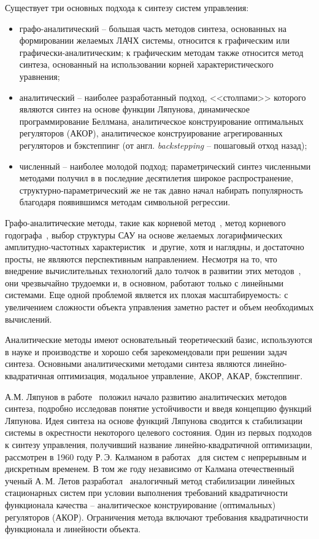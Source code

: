 Существует три основных подхода к синтезу систем управления:
\begin{itemize}
    \item графо-аналитический -- большая часть методов синтеза, основанных на формировании желаемых ЛАЧХ системы, относится к графическим или графически-аналитическим; к графическим методам также относится метод синтеза, основанный на использовании корней характеристического уравнения;
    \item аналитический -- наиболее разработанный подход, <<столпами>> которого являются синтез на основе функции Ляпунова, динамическое программирование Беллмана, аналитическое конструирование оптимальных регуляторов (АКОР), аналитическое конструирование агрегированных регуляторов и бэкстеппинг (от англ. \textit{backstepping} -- пошаговый отход назад);
    \item численный -- наиболее молодой подход; параметрический синтез численными методами получил в в последние десятилетия широкое распространение, структурно-параметрический же не так давно начал набирать популярность благодаря появившимся методам символьной регрессии.
\end{itemize}

Графо-аналитические методы, такие как корневой метод~\cite{Соколов1952}, метод корневого годографа~\cite{Kuo1967}, выбор структуры САУ на основе желаемых логарифмических амплитудно-частотных характеристик~\cite{Солодовников1953} и другие, хотя и наглядны, и достаточно просты, не являются перспективным направлением. 
Несмотря на то, что внедрение вычислительных технологий дало толчок в развитии этих методов~\cite{Барковский1981, Имаев1998}, они чрезвычайно трудоемки и, в основном, работают только с линейными системами. Еще одной проблемой является их плохая масштабируемость: с увеличением сложности объекта управления заметно растет и объем необходимых вычислений.

Аналитические методы имеют основательный теоретический базис, используются в науке и производстве и хорошо себя зарекомендовали при решении задач синтеза. Основными аналитическими методами синтеза являются линейно-квадратичная оптимизация, модальное управление, АКОР, АКАР, бэкстеппинг.

А.М. Ляпунов в работе~\cite{Ляпунов1935} положил начало развитию аналитических методов синтеза, подробно исследовав понятие устойчивости и введя концепцию функций Ляпунова.
Идея синтеза на основе функций Ляпунова сводится к стабилизации системы в окрестности некоторого целевого состояния.
Один из первых подходов к синтезу управления, получивший название линейно-квадратичной оптимизации, рассмотрен в 1960 году Р.\,Э. Калманом в работах~\cite{Kalman1960, Kalman1960a} для систем с непрерывным и дискретным временем.
В том же году независимо от Калмана отечественный ученый А.\,М. Летов разработал~\cite{Летов1960,Летов1960a,Летов1960b,Летов1961,Летов1962} аналогичный метод стабилизации линейных стационарных систем при условии выполнения требований квадратичности функционала качества -- аналитическое конструирование (оптимальных) регуляторов (АКОР).
Ограничения метода включают требования квадратичности функционала и линейности объекта.

